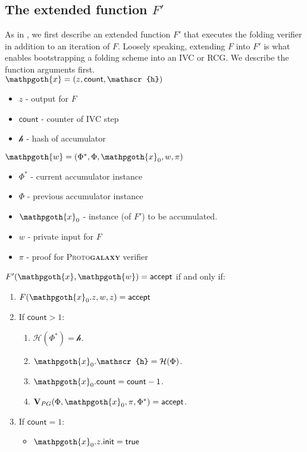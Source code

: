 \documentclass[11pt]{article} %
\newcommand{\protogal}{{\scshape Proto\bfseries{galaxy}}\xspace}
\newcommand{\accept}{\ensuremath{\mathsf{accept}}\xspace}
\newcommand{\hash}{\ensuremath{\mathcal{H}}\xspace}
\newcommand{\prf}{\ensuremath{\mathsf{\pi}}\xspace}
\newcommand{\instFprime}{\ensuremath{\mathpgoth{x}}\xspace}
\newcommand{\witFprime}{\ensuremath{\mathpgoth{w}}\xspace}
\newcommand{\acchash}{\ensuremath{\mathscr{h}}\xspace}
\newcommand{\cnt}{\ensuremath{\mathsf{count}}\xspace}
\newcommand{\ver}{\ensuremath{\mathsf{\mathbf{V}}}\xspace}
\newcommand{\verpg}{\ensuremath{\ver_{PG}}\xspace}
\newcommand{\instt}{\ensuremath{\Phi^*}\xspace}
\newcommand{\insttbase}{\ensuremath{\Phi}\xspace}
\newcommand{\init}{\ensuremath{\mathsf{init}}\xspace}
\newcommand{\true}{\ensuremath{\mathsf{true}}\xspace}
\begin{document}
\subsection{The extended function $F'$}
As in \cite{nova,othernova}, we first describe an extended function $F'$ that executes the folding verifier in addition to an iteration of $F$. Loosely speaking, extending $F$ into $F'$ is what enables bootstrapping a folding scheme into an IVC or RCG. We describe the function arguments first.\\

\noindent
$\instFprime=(z,\cnt,\acchash)$
\begin{itemize}
 \item $z$ - output for $F$
\item $\cnt$ - counter of IVC step
\item $\acchash$  - hash of accumulator
\end{itemize}
$\witFprime=(\instt,\insttbase,\instFprime_0,w,\prf)$
\begin{itemize}
\item$\instt$ - current accumulator instance
\item$\insttbase$ - previous accumulator instance
\item$\instFprime_0$ - instance (of $F'$) to be accumulated.
\item$w$ - private input for $F$
\item$\prf$ - proof for \protogal verifier
\end{itemize}


\noindent
$F'(\instFprime,\witFprime)=\accept$ if and only if:
\begin{enumerate}
    \item $F(\instFprime_0.z, w,z)=\accept$
\item If $\cnt>1$:
\begin{enumerate}
 \item  $\hash(\instt)=\acchash$.
\item $\instFprime_0.\acchash=\hash(\insttbase)$.
    \item $\instFprime_0.\cnt=\cnt-1$.
\item $\verpg(\insttbase, \instFprime_0, \prf, \instt )= \accept$.
    \end{enumerate}
    
\item If $\cnt=1$:
\begin{itemize}
    \item $\instFprime_0.z.\init=\true$

    \end{itemize}
\end{enumerate}
\end{document}

